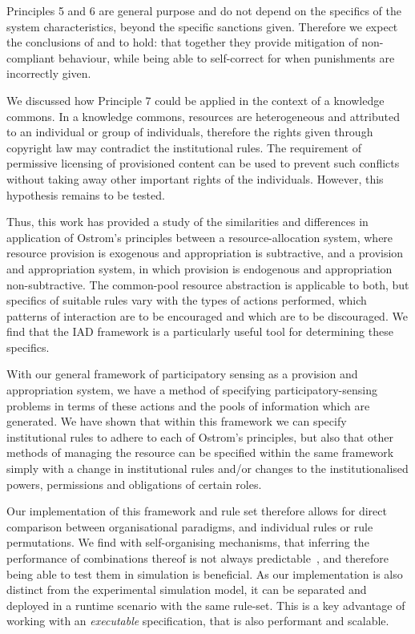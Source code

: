 Principles 5 and 6 are general purpose and do not depend on the specifics of
the system characteristics, beyond the specific sanctions given. Therefore we
expect the conclusions of \citet{Pitt2012b} and \citet{Schaumeier2013} to hold: that
together they provide mitigation of non-compliant behaviour, while being able
to self-correct for when punishments are incorrectly given.

We discussed how Principle 7 could be applied in the context of a knowledge
commons. In a knowledge commons, resources are heterogeneous and attributed
to an individual or group of individuals, therefore the rights given through
copyright law may contradict the institutional rules. The requirement of
permissive licensing of provisioned content can be used to prevent such
conflicts without taking away other important rights of the individuals.
However, this hypothesis remains to be tested.

Thus, this work has provided a study of the similarities and differences in
application of Ostrom's principles between a resource-allocation system, where
resource provision is exogenous and appropriation is subtractive, and a
provision and appropriation system, in which provision is endogenous and
appropriation non-subtractive. The common-pool resource abstraction is
applicable to both, but specifics of suitable rules vary with the types of
actions performed, which patterns of interaction are to be encouraged and
which are to be discouraged. We find that the \ac{IAD} framework is a
particularly useful tool for determining these specifics.

With our general framework of participatory sensing as a provision and
appropriation system, we have a method of specifying participatory-sensing
problems in terms of these actions and the pools of information which are
generated. We have shown that within this framework we can specify
institutional rules to adhere to each of Ostrom's principles, but also that
other methods of managing the resource can be specified within the same
framework simply with a change in institutional rules and/or changes to the
institutionalised powers, permissions and obligations of certain roles.

Our implementation of this framework and rule set therefore allows for direct
comparison between organisational paradigms, and individual rules or rule
permutations. We find with self-organising mechanisms, that inferring the
performance of combinations thereof is not always
predictable~\citep{Sanderson2013}, and therefore being able to test them in
simulation is beneficial. As our implementation is also distinct from the
experimental simulation model, it can be separated and deployed in a runtime
scenario with the same rule-set. This is a key advantage of working with an
\emph{executable} specification, that is also performant and scalable.

